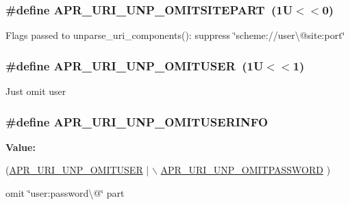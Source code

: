 \subsubsection[{\texorpdfstring{A\+P\+R\+\_\+\+U\+R\+I\+\_\+\+U\+N\+P\+\_\+\+O\+M\+I\+T\+S\+I\+T\+E\+P\+A\+RT}{APR_URI_UNP_OMITSITEPART}}]{\setlength{\rightskip}{0pt plus 5cm}\#define A\+P\+R\+\_\+\+U\+R\+I\+\_\+\+U\+N\+P\+\_\+\+O\+M\+I\+T\+S\+I\+T\+E\+P\+A\+RT~(1\+U$<$$<$0)}\hypertarget{group__APR__Util__URI_gaef80da6212c6838ac15bbcafa1e9745b}{}\label{group__APR__Util__URI_gaef80da6212c6838ac15bbcafa1e9745b}
Flags passed to unparse\+\_\+uri\+\_\+components()\+: suppress \char`\"{}scheme\+://user\textbackslash{}@site\+:port\char`\"{} 
\subsubsection[{\texorpdfstring{A\+P\+R\+\_\+\+U\+R\+I\+\_\+\+U\+N\+P\+\_\+\+O\+M\+I\+T\+U\+S\+ER}{APR_URI_UNP_OMITUSER}}]{\setlength{\rightskip}{0pt plus 5cm}\#define A\+P\+R\+\_\+\+U\+R\+I\+\_\+\+U\+N\+P\+\_\+\+O\+M\+I\+T\+U\+S\+ER~(1\+U$<$$<$1)}\hypertarget{group__APR__Util__URI_ga93a8095f746bb8d4f4e5d8d6ca102ebc}{}\label{group__APR__Util__URI_ga93a8095f746bb8d4f4e5d8d6ca102ebc}
Just omit user 
\subsubsection[{\texorpdfstring{A\+P\+R\+\_\+\+U\+R\+I\+\_\+\+U\+N\+P\+\_\+\+O\+M\+I\+T\+U\+S\+E\+R\+I\+N\+FO}{APR_URI_UNP_OMITUSERINFO}}]{\setlength{\rightskip}{0pt plus 5cm}\#define A\+P\+R\+\_\+\+U\+R\+I\+\_\+\+U\+N\+P\+\_\+\+O\+M\+I\+T\+U\+S\+E\+R\+I\+N\+FO}\hypertarget{group__APR__Util__URI_gad573c75c47cc369ffc0a5776c3613494}{}\label{group__APR__Util__URI_gad573c75c47cc369ffc0a5776c3613494}
{\bfseries Value\+:}
\begin{DoxyCode}
(\hyperlink{group__APR__Util__URI_ga93a8095f746bb8d4f4e5d8d6ca102ebc}{APR\_URI\_UNP\_OMITUSER} | \hyperlink{group__APR__Util__URI_gaed3be741b9a68eb4ee156c6a35b137ff}{\(\backslash\)}
\hyperlink{group__APR__Util__URI_gaed3be741b9a68eb4ee156c6a35b137ff}{                                     APR\_URI\_UNP\_OMITPASSWORD}
      )
\end{DoxyCode}
omit \char`\"{}user\+:password\textbackslash{}@\char`\"{} part 
